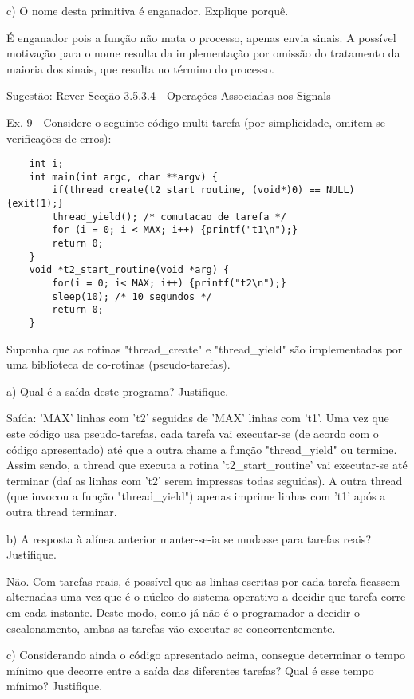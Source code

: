 \documentclass[11pt]{article}
\begin{document}
c) O nome desta primitiva é enganador. Explique porquê.

É enganador pois a função não mata o processo, apenas envia sinais. A possível motivação para o nome resulta da implementação por omissão do tratamento da maioria dos sinais, que resulta no término do processo.

Sugestão: Rever Secção 3.5.3.4 - Operações Associadas aos Signals


Ex. 9 - Considere o seguinte código multi-tarefa (por simplicidade, omitem-se verificações de erros):

\begin{lstlisting}
    int i;
    int main(int argc, char **argv) {
        if(thread_create(t2_start_routine, (void*)0) == NULL) {exit(1);}
        thread_yield(); /* comutacao de tarefa */
        for (i = 0; i < MAX; i++) {printf("t1\n");}
        return 0;
    }
    void *t2_start_routine(void *arg) {
        for(i = 0; i< MAX; i++) {printf("t2\n");}
        sleep(10); /* 10 segundos */
        return 0;
    }
\end{lstlisting}

Suponha que as rotinas "thread\_create" e "thread\_yield" são implementadas por uma biblioteca de co-rotinas (pseudo-tarefas).

a) Qual é a saída deste programa? Justifique.

Saída: 'MAX' linhas com 't2' seguidas de 'MAX' linhas com 't1'. Uma vez que este código usa pseudo-tarefas, cada tarefa vai executar-se (de acordo com o código apresentado) até que a outra chame a função "thread\_yield" ou termine. Assim sendo, a thread que executa a rotina 't2\_start\_routine' vai executar-se até terminar (daí as linhas com 't2' serem impressas todas seguidas). A outra thread (que invocou a função "thread\_yield") apenas imprime linhas com 't1' após a outra thread terminar.

b) A resposta à alínea anterior manter-se-ia se mudasse para tarefas reais? Justifique.

Não. Com tarefas reais, é possível que as linhas escritas por cada tarefa ficassem alternadas uma vez que é o núcleo do sistema operativo a decidir que tarefa corre em cada instante. Deste modo, como já não é o programador a decidir o escalonamento, ambas as tarefas vão executar-se concorrentemente.

c) Considerando ainda o código apresentado acima, consegue determinar o tempo mínimo que decorre entre a saída das diferentes tarefas? Qual é esse tempo mínimo? Justifique.
\end{document}
